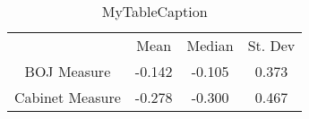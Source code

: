 \documentclass[10pt]{article}
\begin{document}
\begin{table}
\centering
\begin{tabular}{cccc}
 & Mean & Median & St. Dev \\
BOJ Measure & -0.142 & -0.105 & 0.373 \\
Cabinet Measure & -0.278 & -0.300 & 0.467 \\
\end{tabular}
\caption{MyTableCaption}
\label{table:MyTableLabel}
\end{table}
\end{document}
